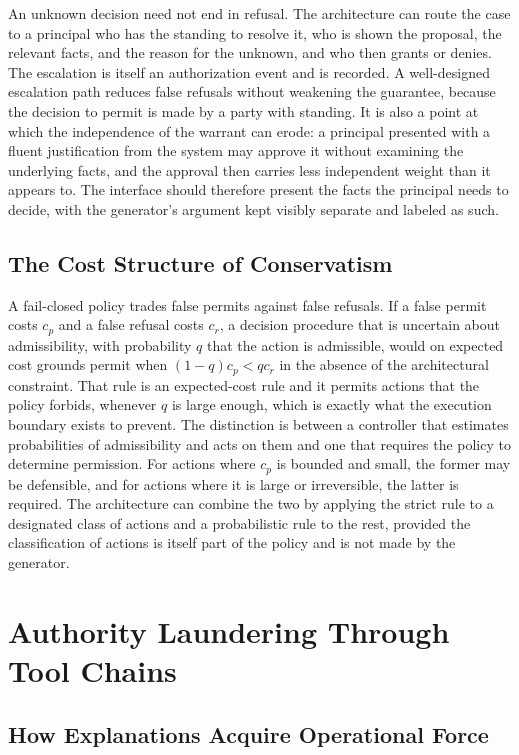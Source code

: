 An unknown decision need not end in refusal. The architecture can route the case to a principal who has the standing to resolve it, who is shown the proposal, the relevant facts, and the reason for the unknown, and who then grants or denies. The escalation is itself an authorization event and is recorded. A well-designed escalation path reduces false refusals without weakening the guarantee, because the decision to permit is made by a party with standing. It is also a point at which the independence of the warrant can erode: a principal presented with a fluent justification from the system may approve it without examining the underlying facts, and the approval then carries less independent weight than it appears to. The interface should therefore present the facts the principal needs to decide, with the generator's argument kept visibly separate and labeled as such.

\section{The Cost Structure of Conservatism}

A fail-closed policy trades false permits against false refusals. If a false permit costs $c_p$ and a false refusal costs $c_r$, a decision procedure that is uncertain about admissibility, with probability $q$ that the action is admissible, would on expected cost grounds permit when $(1-q)c_p<qc_r$ in the absence of the architectural constraint. That rule is an expected-cost rule and it permits actions that the policy forbids, whenever $q$ is large enough, which is exactly what the execution boundary exists to prevent. The distinction is between a controller that estimates probabilities of admissibility and acts on them and one that requires the policy to determine permission. For actions where $c_p$ is bounded and small, the former may be defensible, and for actions where it is large or irreversible, the latter is required. The architecture can combine the two by applying the strict rule to a designated class of actions and a probabilistic rule to the rest, provided the classification of actions is itself part of the policy and is not made by the generator.

\chapter{Authority Laundering Through Tool Chains}
\label{ch:laundering}

\section{How Explanations Acquire Operational Force}

